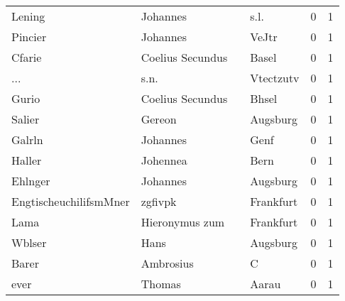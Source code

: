 \begin{tabular}{llllrr}
                   Lening &                           Johannes &             &                                        s.l. &          0 &         1 \\
                  Pincier &                           Johannes &             &                                       VeJtr &          0 &         1 \\
                   Cfarie &                   Coelius Secundus &             &                                       Basel &          0 &         1 \\
                      ... &                               s.n. &             &                                   Vtectzutv &          0 &         1 \\
                    Gurio &                   Coelius Secundus &             &                                       Bhsel &          0 &         1 \\
                   Salier &                             Gereon &             &                                    Augsburg &          0 &         1 \\
                   Galrln &                           Johannes &             &                                        Genf &          0 &         1 \\
                   Haller &                           Johennea &             &                                        Bern &          0 &         1 \\
                  Ehlnger &                           Johannes &             &                                    Augsburg &          0 &         1 \\
   EngtischeuchilifsmMner &                            zgfivpk &             &                                   Frankfurt &          0 &         1 \\
                     Lama &                     Hieronymus zum &             &                                   Frankfurt &          0 &         1 \\
                   Wblser &                               Hans &             &                                    Augsburg &          0 &         1 \\
                    Barer &                          Ambrosius &             &                                           C &          0 &         1 \\
                     ever &                             Thomas &             &                                       Aarau &          0 &         1 \\

\end{tabular}
